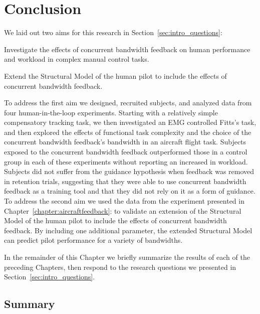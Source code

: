 \chapter{Conclusion}
\label{chap:conclusion}

We laid out two aims for this research in Section~\ref{sec:intro_questions}:
\begin{description}[align=left]
    \item [Aim One] Investigate the effects of concurrent bandwidth feedback on human performance and workload in complex manual control tasks.
    \item [Aim Two] Extend the Structural Model of the human pilot to include the effects of concurrent bandwidth feedback.
\end{description}

To address the first aim we designed, recruited subjects, and analyzed data from four human-in-the-loop experiments.
Starting with a relatively simple compensatory tracking task, we then investigated an EMG controlled Fitts's task, and then explored the effects of functional task complexity and the choice of the concurrent bandwidth feedback's bandwidth in an aircraft flight task.
Subjects exposed to the concurrent bandwidth feedback outperformed those in a control group in each of these experiments without reporting an increased in workload.
Subjects did not suffer from the guidance hypothesis when feedback was removed in retention trials, suggesting that they were able to use concurrent bandwidth feedback as a training tool and that they did not rely on it as a form of guidance.
To address the second aim we used the data from the experiment presented in Chapter~\ref{chapter:aircraftfeedback}:  to validate an extension of the Structural Model of the human pilot to include the effects of concurrent bandwidth feedback.
By including one additional parameter, the extended Structural Model can predict pilot performance for a variety of bandwidths.

In the remainder of this Chapter we briefly summarize the results of each of the preceding Chapters, then respond to the research questions we presented in Section~\ref{sec:intro_questions}.

\section{Summary}


